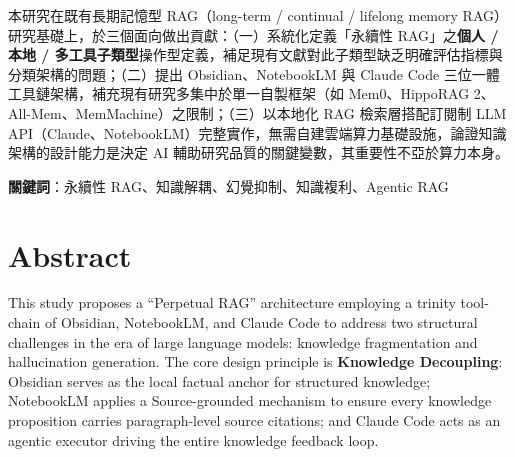 本研究在既有長期記憶型 RAG（long-term / continual / lifelong memory
RAG）研究基礎上，於三個面向做出貢獻：（一）系統化定義「永續性
RAG」之\textbf{個人 / 本地 /
多工具子類型}操作型定義，補足現有文獻對此子類型缺乏明確評估指標與分類架構的問題；（二）提出
Obsidian、NotebookLM 與 Claude Code
三位一體工具鏈架構，補充現有研究多集中於單一自製框架（如 Mem0、HippoRAG
2、All-Mem、MemMachine）之限制；（三）以本地化 RAG 檢索層搭配訂閱制 LLM
API（Claude、NotebookLM）完整實作，無需自建雲端算力基礎設施，論證知識架構的設計能力是決定
AI 輔助研究品質的關鍵變數，其重要性不亞於算力本身。

\textbf{關鍵詞}：永續性 RAG、知識解耦、幻覺抑制、知識複利、Agentic RAG

\section{Abstract}\label{abstract}

This study proposes a ``Perpetual RAG'' architecture employing a trinity
tool-chain of Obsidian, NotebookLM, and Claude Code to address two
structural challenges in the era of large language models: knowledge
fragmentation and hallucination generation. The core design principle is
\textbf{Knowledge Decoupling}: Obsidian serves as the local factual
anchor for structured knowledge; NotebookLM applies a Source-grounded
mechanism to ensure every knowledge proposition carries paragraph-level
source citations; and Claude Code acts as an agentic executor driving
the entire knowledge feedback loop.

